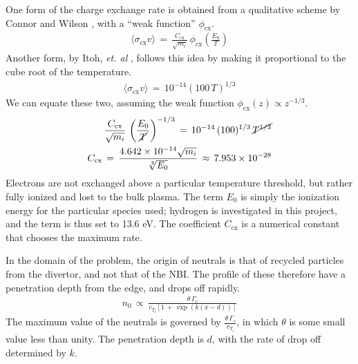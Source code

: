 One form of the charge exchange rate is obtained from a qualitative scheme by Connor and Wilson \cite{connor_review_2000}, with a ``weak function'' $\phi_\text{cx}$.
\begin{align} %
	\langle \sigma_\text{cx} v\rangle \,=\, \frac{C_\text{cx}}{\sqrt{m_i}} \,
		\phi_\text{cx}\left(\frac{E_0}{T}\right) \label{eq:connor_cx_rate}
\end{align}
Another form, by Itoh, \emph{et. al} \cite{itoh_model_1989}, follows this idea by making it proportional to the cube root of the temperature.
\begin{align} %
	\langle \sigma_\text{cx} v\rangle \,=\, 10^{-14}
		\left(100 \, T\right)^{1/3} \label{eq:itoh_cx_rate}
\end{align}
We can equate these two, assuming the weak function $\phi_\text{cx}(z) \propto z^{-1/3}$.
\begin{align}
	\frac{C_\text{cx}}{\sqrt{m_i}} \, \left(\frac{E_0}{\cancel{T}}\right)^{-1/3}
		\,=\, 10^{-14} \, (100)^{1/3} \, \cancel{T^{1/3}} \\
	C_\text{cx} \,=\, \frac{4.642\times 10^{-14} \sqrt{m_i}}{\sqrt[3]{E_0}}
		\,\approx\, 7.953\times 10^{-28}
\end{align}
Electrons are not exchanged above a particular temperature threshold, but rather fully ionized and lost to the bulk plasma.
The term $E_0$ is simply the ionization energy for the particular species used; hydrogen is investigated in this project, and the term is thus set to 13.6 eV.
The coefficient $C_\text{cx}$ is a numerical constant that chooses the maximum rate.

In the domain of the problem, the origin of neutrals is that of recycled particles from the divertor, and not that of the NBI.
The profile of these therefore have a penetration depth from the edge, and drops off rapidly.
\begin{align} %
	n_0 \,\propto\, \frac{\theta\,\Gamma_c}{v_{T_i}\left[1 \,+\,
	\exp{(k(x - d))}\right]} \label{eq:neutral_density}
\end{align}
The maximum value of the neutrals is governed by $\frac{\theta\,\Gamma_c}{v_{T_i}}$, in which $\theta$ is some small value less than unity.
The penetration depth is $d$, with the rate of drop off determined by $k$.

